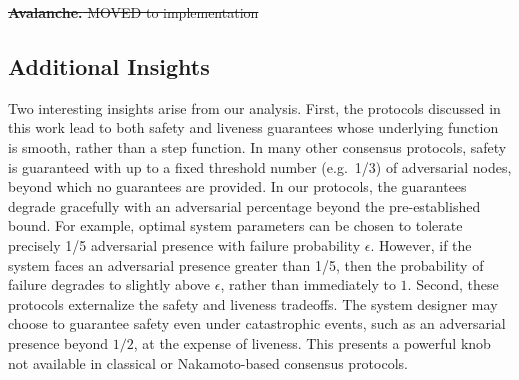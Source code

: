 \documentclass[letterpaper,twocolumn,10pt]{article}
\newcommand{\editremove}[1]{{\color{red}\sout{#1}}}
\theoremstyle{definition}
\newcommand{\Jon}[1]{{\color{blue} \textbf{Jon: } #1}}
\begin{document}
\editremove{%
\noindent\textbf{Avalanche.}
MOVED to implementation}

\subsection{Additional Insights}
Two interesting insights arise from our analysis.
First, the protocols discussed in this work lead to both safety and liveness guarantees whose underlying function is smooth, rather than a step function. 
In many other consensus protocols, safety is guaranteed with up to a fixed threshold number (e.g.~1/3) of adversarial nodes, beyond which no guarantees are provided. In our protocols, the guarantees degrade gracefully with an adversarial percentage beyond the pre-established bound. For example, optimal system parameters can be chosen to tolerate precisely 1/5 adversarial presence with failure probability $\epsilon$. However, if the system faces an adversarial presence greater than 1/5, then the probability of failure degrades to slightly above $\epsilon$, rather than immediately to $1$. 
Second, these protocols externalize the safety and liveness tradeoffs. 
The system designer may choose to guarantee safety even under catastrophic events, such as an adversarial presence beyond $1/2$, at the expense of liveness.  
This presents a powerful knob not available in classical or Nakamoto-based consensus protocols. 


\end{document}

